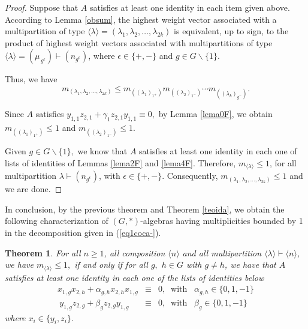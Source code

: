 \documentclass{amsart}
\newtheorem{teorema}{Theorem}[section]
\numberwithin{equation}{section}
\begin{document}
    \begin{proof} 
    Suppose that $A$ satisfies at least one identity in each item given above. According to Lemma \ref{obsum}, 
    the highest weight vector  associated with a multipartition of type $\langle \lambda \rangle=(\lambda_1, \lambda_2, \ldots, \lambda_{2k})$ is equivalent, up to sign, to the product of highest weight vectors associated with 
    multipartitions of type $\langle \lambda \rangle =(\mu_{\,g^\epsilon})\vdash (n_{g^{\epsilon}})$, where $\epsilon \in \{+,-\}$ and $g\in G\backslash \{1\}.$
    


Thus, we have $$m_{(\lambda_1,\lambda_2,\ldots,\lambda_{2k})}\le m_{((\lambda_1)_{1^+})}m_{((\lambda_2)_{1^-})}\cdots m_{((\lambda_k)_{g^-})}.$$ 
    
    Since $A$ satisfies $y_{1,1}z_{2,1}+\gamma_1z_{2,1}y_{1,1}\equiv 0,$  by Lemma \ref{lema0F}, we obtain $m_{((\lambda_1)_{1^+})}\le 1$ and $m_{((\lambda_2)_{1^-})}\le 1.$

Given $g\in G\backslash \{1\},$ we know that $A$  satisfies at least one identity in each one of lists of identities of Lemmas \ref{lema2F} and \ref{lema4F}. Therefore,  $m_{\langle \lambda \rangle}\le 1$, for all multipartition $\lambda \vdash (n_{g^\epsilon})$, with $\epsilon\in \{+,-\}$.
Consequently, $m_{{(\lambda_1,\lambda_2,\ldots,\lambda_{2k})}} \le 1$  and we are done.  
    \end{proof}
    
In conclusion, by the previous theorem and Theorem \ref{teoida}, we obtain the following characterization of $(G,*)$-algebras having multiplicities bounded by 1 in the decomposition given in (\ref{eq1coca-}).

\begin{teorema}\label{resultado} 
For all $n\geq 1$, all composition $\langle n \rangle$ and all multipartition $\langle \lambda \rangle \vdash \langle n \rangle$, we have $m_{\langle \lambda \rangle}\le 1,$ if and only if for all $g,$ $ h \in G$ with $g \neq h$, %
    we have that
	$A$ satisfies
	at least one identity in each one of the lists of identities below 
$$\begin{array}{lcl} x_{1,g}x_{2,h}+\alpha_{g,h}x_{2,h}x_{1,g}&\equiv& 0, \;\; \mbox{with} \;\;\; \alpha_{g,h} \in \{0, 1, -1\}  \\
    ~ y_{1,g}z_{2,g}+\beta_g z_{2,g} y_{1,g}& \equiv&0, \;\;\mbox{with}\;\;\;\beta_g \in \{0, 1, -1\}\end{array}$$
    where $x_i \in \{y_i, z_i\}$. 

\end{teorema}
		
\end{document}

